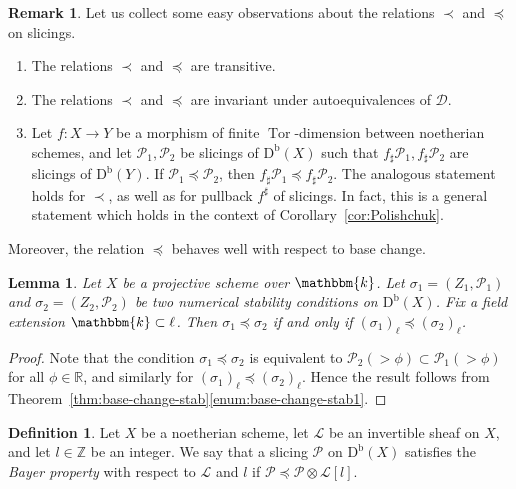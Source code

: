 \documentclass[11pt, reqno]{amsart}
\numberwithin{equation}{section}
\theoremstyle{plain}
\newtheorem{lemma}[theorem]{Lemma}
\theoremstyle{remark}
\theoremstyle{definition}
\newtheorem{definition}[theorem]{Definition}
\newtheorem{remark}[theorem]{Remark}
\theoremstyle{italicsname}
\newcommand{\Db}{\mathrm{D^b}}
\DeclareMathOperator{\Tor}{Tor}
\newcommand{\cL}{\mathcal{L}}
\newcommand{\cD}{\mathscr{D}}
\newcommand{\cP}{\mathscr{P}}
\newcommand{\KK}{\mathbbm{k}}
\def\RR{\ensuremath{\mathbb{R}}}
\def\ZZ{\ensuremath{\mathbb{Z}}}
\begin{document}
\begin{remark} 
\label{rmk:properties-preceq}
Let us collect some easy observations about the relations $\prec$ and $\preceq$ on slicings. 
\begin{enumerate}[{\rm (1)}]
\item The relations $\prec$ and $\preceq$ are transitive. 
\item The relations $\prec$ and $\preceq$ are invariant under autoequivalences of $\cD$. 
\item 
    \label{enum:CompatibilitySlicings3} 
    Let $f\colon X\to Y$ be a morphism of finite $\Tor$-dimension between noetherian schemes, and let $\cP_1,\cP_2$ be slicings of $\Db(X)$ such that $f_\sharp\cP_1,f_\sharp\cP_2$ are slicings of $\Db(Y)$.
    If $\cP_1\preceq\cP_2$, then $f_\sharp\cP_1\preceq f_\sharp\cP_2$.
    The analogous statement holds for $\prec$, as well as for pullback $f^{\sharp}$ of slicings. 
    In fact, this is a general statement which holds in the context of Corollary~\ref{cor:Polishchuk}.
\end{enumerate} 
\end{remark}

Moreover, the relation $\preceq$ behaves well  with respect to base change. 

\begin{lemma}\label{lem:base-change-preserve-order-stab}
Let $X$ be a projective scheme over $\KK$. 
Let $\sigma_1 = (Z_1, \cP_1)$ and $\sigma_2 = (Z_2, \cP_2)$ be two numerical stability conditions on $\Db(X)$.  
Fix a field extension $\KK\subset\ell$. 
Then $\sigma_1 \preceq \sigma_2$ if and only if $(\sigma_1)_{\ell} \preceq (\sigma_2)_{\ell}$.
\end{lemma}

\begin{proof}
Note that the condition $\sigma_1 \preceq \sigma_2$ is equivalent to $\cP_2(> \phi) \subset \cP_{1}(> \phi)$ for all $\phi \in \RR$, and similarly for $(\sigma_1)_{\ell} \preceq (\sigma_2)_{\ell}$. 
Hence the result follows from Theorem~\ref{thm:base-change-stab}\ref{enum:base-change-stab1}.
\end{proof}

\begin{definition}\label{def:BayerConditions}
Let $X$ be a noetherian scheme, let $\cL$ be an invertible sheaf on $X$, and let $l\in \ZZ$ be an integer.
We say that a slicing $\cP$ on $\Db(X)$ satisfies the \emph{Bayer property} with respect to $\cL$ and $l$  if $\cP\preceq\cP\otimes\cL[l]$.
\end{definition}
\end{document}
